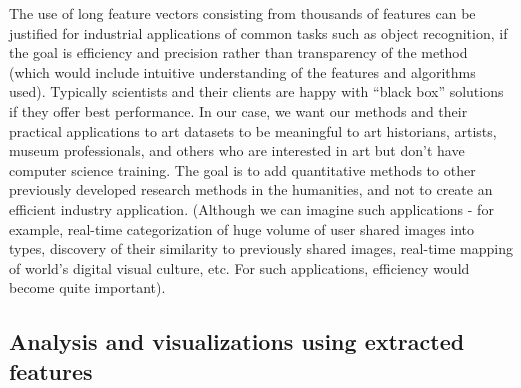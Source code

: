 \documentclass[letterpaper]{article}
\begin{document}
	The use of long feature vectors consisting from thousands of features can be justified for industrial applications of common tasks such as object recognition, if the goal is efficiency and precision rather than transparency of the method (which would include intuitive understanding of the features and algorithms used). Typically scientists and their clients are happy with “black box” solutions if they offer best performance. In our case, we want our methods and their practical applications to art datasets to be meaningful to art historians, artists, museum professionals, and others who are interested in art but don’t have computer science training. The goal is to add quantitative methods to other previously developed research methods in the humanities, and not to create an efficient industry application. (Although we can imagine such applications - for example, real-time categorization of huge volume of user shared images into types, discovery of their similarity to previously shared images, real-time mapping of world’s digital visual culture, etc. For such applications, efficiency would become quite important). 


\subsection{Analysis and visualizations using extracted features}
\end{document}
